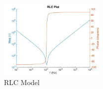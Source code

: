 \begin{figure}[ht!]
\includegraphics[keepaspectratio=true,width=2in]{./figures/modeling/rlcModel.jpg}
\centering
\caption{RLC Model}
\label{fig:rlcModel}
\end{figure}
